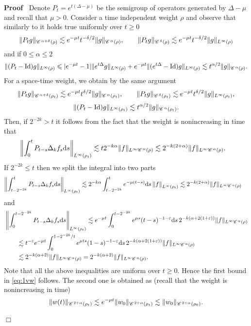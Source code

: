 \documentclass[a4paper,11pt]{article}
\renewcommand{\leq}{\leqslant}
\renewcommand{\geq}{\geqslant}
\newenvironment{proof}{\noindent\textbf{Proof\ }}{\hspace*{\fill}$\Box$\medskip}
\numberwithin{equation}{section}
\newcommand{\CC}{\mathscr{C} \hspace{.1em}}
\newcommand{\8}{\infty}
\newcommand{\dd}{\mathrm{d}}
\begin{document}
\begin{proof}
Denote $P_{t}=e^{t(\Delta-\mu)}$ be the semigroup of operators generated by $\Delta-\mu$ and recall that  $\mu>0$. Consider a time independent weight $\rho$ and  observe that similarly to \cite[Lemma A.7, Lemma A.8]{GIP} it holds true  uniformly over $t\geq 0$
\begin{align*}
\|P_{t}g\|_{\CC^{\alpha+\delta}(\rho)}\lesssim e^{-\mu t}t^{-\delta/2}\|g\|_{\CC^{\alpha}(\rho)},\qquad \|P_{t}g\|_{\CC^{\delta}(\rho)}\lesssim e^{-\mu t} t^{-\delta/2}\|g\|_{L^{\8}(\rho)}
\end{align*}
and if $0\leq\alpha \leqslant 2$
$$
\|(P_{t}-\mathrm{Id})g\|_{L^{\8}(\rho)}\leqslant |e^{-\mu t}-1|\|e^{t\Delta}g \|_{L^{\8}(\rho)}+e^{-\mu t}\|(e^{t\Delta}-\mathrm{Id})g \|_{L^{\8}(\rho)} \lesssim t^{\alpha/2}\|g\|_{\CC^{\alpha}(\rho)}.
$$
For a space-time weight, we obtain by the same  argument 
\begin{align}\label{eq:sch10}
\|P_{t}g\|_{\CC^{\alpha+\delta}(\rho_{t})}\lesssim e^{-\mu t}t^{\delta/2}\|g\|_{\CC^{\alpha}(\rho_{t})},\qquad \|P_{t}g\|_{\CC^{\delta}(\rho_{t})}\lesssim e^{-\mu t} t^{\delta/2}\|g\|_{L^{\8}(\rho_{t})},
\end{align}
$$
\|(P_{t}-\mathrm{Id})g\|_{L^{\8}(\rho_{t})} \lesssim t^{\alpha/2}\|g\|_{\CC^{\alpha}(\rho_{t})}.
$$
Then, if $2^{-2k}>t$  it follows from the fact that the weight is nonincreasing in time that
\begin{align*}
\left\|\int_{0}^{t}P_{t-s}\Delta_{k}f_{s}\mathrm{d}s\right\|_{L^{\infty}(\rho_{t})}&\lesssim t 2^{-k\alpha}\|f\|_{L^{\infty}\CC^{\alpha}(\rho)}\lesssim 2^{-k(2+\alpha)}\|f\|_{L^{\infty}\CC^{\alpha}(\rho)}.
\end{align*}
If $2^{-2k}\leqslant t$ then we split the integral into two parts
\begin{align*}
\left\|\int_{t-2^{-2k}}^{t}P_{t-s}\Delta_{k}f_{s}\mathrm{d}s\right\|_{L^{\infty}(\rho_{t})}&\lesssim 2^{-k\alpha}\int_{t-2^{-2k}}^{t}e^{-\mu(t-s)}\mathrm{d}s \left\|f\right\|_{L^{\infty}(\rho_{t})}\lesssim 2^{-k(2+\alpha)}\|f\|_{L^{\infty}\CC^{\alpha}(\rho)}
\end{align*}
and
\begin{align*}
&\left\|\int_{0}^{t-2^{-2k}}P_{t-s}\Delta_{k}f_{s}\mathrm{d}s\right\|_{L^{\infty}(\rho_{t})}\lesssim e^{-\mu t} \int_{0}^{t-2^{-2k}}e^{\mu s} (t-s)^{-1-\varepsilon}\dd s \, 2^{-k(\alpha+2(1+\varepsilon))}\|f\|_{L^{\infty}\CC^{\alpha}(\rho)}\\
&\qquad\lesssim t^{-\varepsilon}e^{-\mu t} \int_{0}^{1-2^{-2k}/t}e^{\mu ts} (1-s)^{-1-\varepsilon}\dd s \, 2^{-k(\alpha+2(1+\varepsilon))}\|f\|_{L^{\infty}\CC^{\alpha}(\rho)}\\
&\qquad\lesssim 2^{-k(\alpha+2)}\|f\|_{L^{\infty}\CC^{\alpha}(\rho)}= 2^{-k(\alpha+2)}\|f\|_{L^{\infty}\CC^{\alpha}(\rho)}.
\end{align*}
Note that all the above inequalities are uniform over $t\geq 0$. Hence the first bound in \eqref{eq:1vw} follows. The second one is obtained as (recall that the weight is nonincreasing in time)
$$
\|w(t)\|_{\CC^{2+\alpha}(\rho_{t})}\lesssim e^{-\mu t}\|w_{0}\|_{\CC^{2+\alpha}(\rho_{t})} \lesssim \|w_{0}\|_{\CC^{2+\alpha}(\rho_{0})}.
$$


\end{proof}
\end{document}

